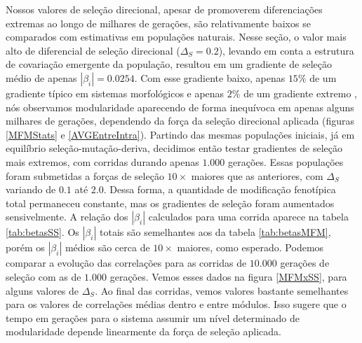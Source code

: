 Nossos valores de seleção direcional, apesar de promoverem
diferenciações extremas ao longo de milhares de gerações, são
relativamente baixos se comparados com estimativas em populações
naturais.
Nesse seção, o valor mais alto de diferencial de seleção direcional
($\Delta_S = 0.2$), levando em conta a
estrutura de covariação emergente da população, resultou em um gradiente de
seleção médio de apenas $|\beta_i| = 0.0254$.
Com esse gradiente baixo, apenas $15\%$ de um gradiente típico em
sistemas morfológicos e apenas $2\%$ de um gradiente extremo
\citep{Kingsolver2001}, nós observamos modularidade aparecendo de forma
inequívoca em apenas alguns milhares de gerações, dependendo da força da
seleção direcional aplicada (figuras \ref{MFMStats} e
\ref{AVGEntreIntra}).
Partindo das mesmas populações iniciais, já em equilíbrio
seleção-mutação-deriva, decidimos então testar gradientes de seleção
mais extremos, com corridas durando apenas $1.000$ gerações.
Essas populações foram submetidas a forças de seleção $10\times$ maiores que
as anteriores, com $\Delta_S$ variando de $0.1$ até $2.0$. 
Dessa forma, a quantidade de modificação fenotípica total permaneceu
constante, mas os gradientes de seleção foram aumentados sensivelmente.
A relação dos $|\beta_i|$ calculados para uma corrida aparece na tabela
\ref{tab:betasSS}.
Os $|\beta_i|$ totais são semelhantes aos da tabela \ref{tab:betasMFM},
porém os $|\beta_i|$ médios são cerca de $10\times$ maiores, como esperado.
Podemos comparar a evolução das correlações para as corridas de $10.000$
gerações de seleção com as de $1.000$ gerações.
Vemos esses dados na figura \ref{MFMxSS}, para alguns valores de
$\Delta_S$.
Ao final das corridas, vemos valores bastante semelhantes para os
valores de correlações médias dentro e entre módulos.
Isso sugere que o tempo em gerações para o sistema assumir um nível
determinado de modularidade depende linearmente da força de seleção
aplicada.

